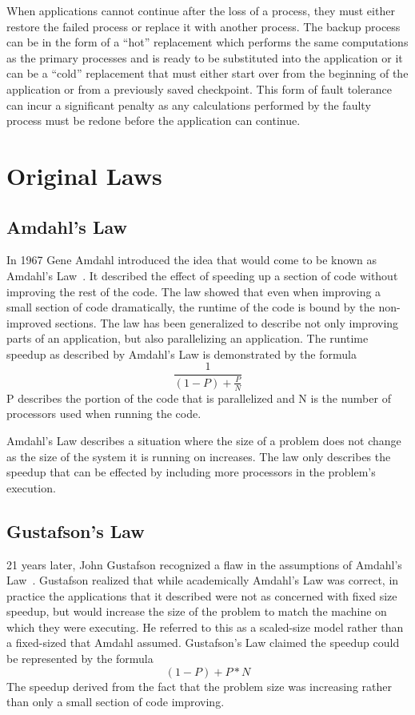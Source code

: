 \documentclass[]{article}
\begin{document}
When applications cannot continue after the loss of a process, they must either restore the failed process or replace it with another process. The backup process can be in the form of a ``hot'' replacement which performs the same computations as the primary processes and is ready to be substituted into the application or it can be a ``cold'' replacement that must either start over from the beginning of the application or from a previously saved checkpoint. This form of fault tolerance can incur a significant penalty as any calculations performed by the faulty process must be redone before the application can continue.

\section{Original Laws}
\label{sect:original}

\subsection{Amdahl's Law}
\label{subsect:amdahl_original}

In 1967 Gene Amdahl introduced the idea that would come to be known as Amdahl's Law~\cite{Amdahl:1967up}. It described the effect of speeding up a section of code without improving the rest of the code. The law showed that even when improving a small section of code dramatically, the runtime of the code is bound by the non-improved sections. The law has been generalized to describe not only improving parts of an application, but also parallelizing an application. The runtime speedup as described by Amdahl's Law is demonstrated by the formula $$\frac{1}{(1-P) + \frac{P}{N}}$$ P describes the portion of the code that is parallelized and N is the number of processors used when running the code.

Amdahl's Law describes a situation where the size of a problem does not change as the size of the system it is running on increases. The law only describes the speedup that can be effected by including more processors in the problem's execution.

\subsection{Gustafson's Law}
\label{subsect:gustafson_original}

21 years later, John Gustafson recognized a flaw in the assumptions of Amdahl's Law~\cite{Gustafson:1988p6477}. Gustafson realized that while academically Amdahl's Law was correct, in practice the applications that it described were not as concerned with fixed size speedup, but would increase the size of the problem to match the machine on which they were executing. He referred to this as a scaled-size model rather than a fixed-sized that Amdahl assumed. Gustafson's Law claimed the speedup could be represented by the formula $$(1-P) + P * N$$ The speedup derived from the fact that the problem size was increasing rather than only a small section of code improving.
\end{document}
